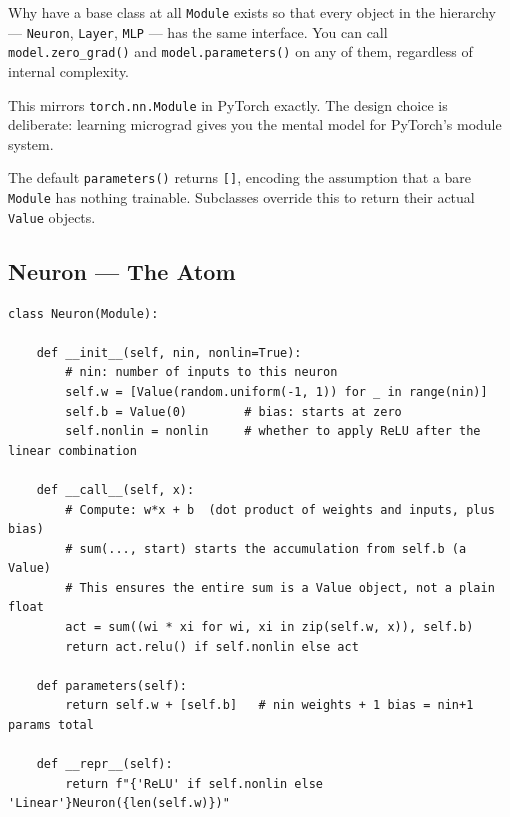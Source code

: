 \documentclass[12pt,a4paper]{article}
\newcommand{\code}[1]{\texttt{\small\color{deepblue}#1}}
\begin{document}
\begin{codeexplainbox}{Why have a base class at all}
\code{Module} exists so that every object in the hierarchy — \code{Neuron}, \code{Layer}, \code{MLP} — has the same interface. You can call \code{model.zero\_grad()} and \code{model.parameters()} on any of them, regardless of internal complexity.

This mirrors \code{torch.nn.Module} in PyTorch exactly. The design choice is deliberate: learning micrograd gives you the mental model for PyTorch's module system.

The default \code{parameters()} returns \code{[]}, encoding the assumption that a bare \code{Module} has nothing trainable. Subclasses override this to return their actual \code{Value} objects.
\end{codeexplainbox}

\subsection{Neuron — The Atom}

\begin{lstlisting}
class Neuron(Module):

    def __init__(self, nin, nonlin=True):
        # nin: number of inputs to this neuron
        self.w = [Value(random.uniform(-1, 1)) for _ in range(nin)]
        self.b = Value(0)        # bias: starts at zero
        self.nonlin = nonlin     # whether to apply ReLU after the linear combination

    def __call__(self, x):
        # Compute: w*x + b  (dot product of weights and inputs, plus bias)
        # sum(..., start) starts the accumulation from self.b (a Value)
        # This ensures the entire sum is a Value object, not a plain float
        act = sum((wi * xi for wi, xi in zip(self.w, x)), self.b)
        return act.relu() if self.nonlin else act

    def parameters(self):
        return self.w + [self.b]   # nin weights + 1 bias = nin+1 params total

    def __repr__(self):
        return f"{'ReLU' if self.nonlin else 'Linear'}Neuron({len(self.w)})"
\end{lstlisting}
\end{document}
